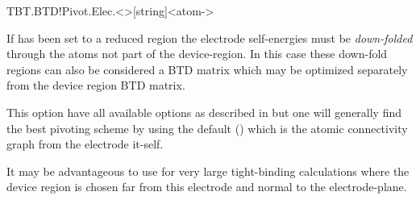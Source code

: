 \begin{fdfentry}{TBT.BTD!Pivot.Elec.<>}[string]<atom-\nonvalue{<>}>

  If  has been set to a reduced region the
  electrode self-energies must be \emph{down-folded} through the atoms
  not part of the device-region. In this case these down-fold regions
  can also be considered a BTD matrix which may be optimized
  separately from the device region BTD matrix.

  This option have all available options as described in
   but one will generally find the best
  pivoting scheme by using the default () which is the
  atomic connectivity graph from the electrode it-self.

  It may be advantageous to use  for very large
  tight-binding calculations where the device region is chosen far
  from this electrode and normal to the electrode-plane. 

\end{fdfentry}

